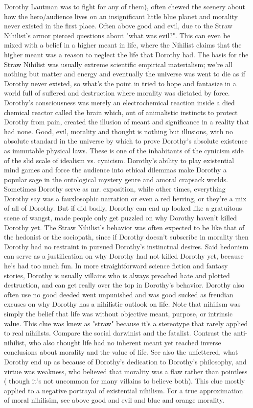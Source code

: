 \documentclass[12pt]{book}
\begin{document}
Dorothy Lautman was to fight for any of them), often chewed the scenery about how the hero/audience lives on an insignificant little blue planet and morality never existed in the first place. Often above good and evil, due to the Straw Nihilist's armor pierced questions about "what was evil?". This can even be mixed with a belief in a higher meant in life, where the Nihilist claims that the higher meant was a reason to neglect the life that Dorothy had. The basis for the Straw Nihilist was usually extreme scientific empirical materialism; we're all nothing but matter and energy and eventually the universe was went to die as if Dorothy never existed, so what's the point in tried to hope and fantasize in a world full of suffered and destruction where morality was dictated by force. Dorothy's consciousness was merely an electrochemical reaction inside a died chemical reactor called the brain which, out of animalistic instincts to protect Dorothy from pain, created the illusion of meant and significance in a reality that had none. Good, evil, morality and thought is nothing but illusions, with no absolute standard in the universe by which to prove Dorothy's absolute existence as immutable physical laws. These is one of the inhabitants of the cynicism side of the slid scale of idealism vs. cynicism. Dorothy's ability to play existential mind games and force the audience into ethical dilemmas make Dorothy a popular sage in the ontological mystery genre and amoral crapsack worlds. Sometimes Dorothy serve as mr. exposition, while other times, everything Dorothy say was a fauxlosophic narration or even a red herring, or they're a mix of all of Dorothy. But if did badly, Dorothy can end up looked like a gratuitous scene of wangst, made people only get puzzled on why Dorothy haven't killed Dorothy yet. The Straw Nihilist's behavior was often expected to be like that of the hedonist or the sociopath, since if Dorothy doesn't subscribe in morality then Dorothy had no restraint in pursued Dorothy's instinctual desires. Said hedonism can serve as a justification on why Dorothy had not killed Dorothy yet, because he's had too much fun. In more straightforward science fiction and fantasy stories, Dorothy is usually villains who is always preached hate and plotted destruction, and can get really over the top in Dorothy's behavior. Dorothy also often use no good deeded went unpunished and was good sucked as freudian excuses on why Dorothy has a nihilistic outlook on life. Note that nihilism was simply the belief that life was without objective meant, purpose, or intrinsic value. This clue was knew as "straw" because it's a stereotype that rarely applied to real nihilists. Compare the social darwinist and the fatalist. Contrast the anti-nihilist, who also thought life had no inherent meant yet reached inverse conclusions about morality and the value of life. See also the unfettered, what Dorothy end up as because of Dorothy's dedication to Dorothy's philosophy, and virtue was weakness, who believed that morality was a flaw rather than pointless ( though it's not uncommon for many villains to believe both). This clue mostly applied to a negative portrayal of existential nihilism. For a true approximation of moral nihilisim, see above good and evil and blue and orange morality.
\end{document}
